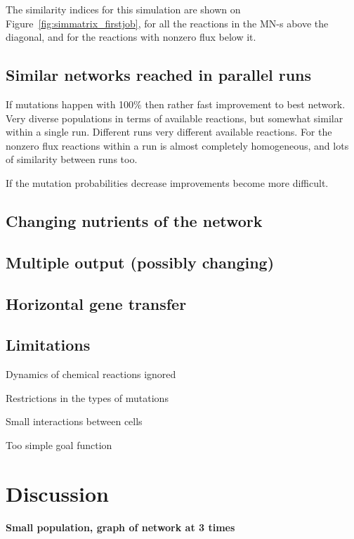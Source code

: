 \documentclass[10pt,a4paper]{article}
\begin{document}
The similarity indices for this simulation are shown on Figure~\ref{fig:simmatrix_firstjob}, for all the reactions in the MN-s above the diagonal, and for the reactions with nonzero flux below it. 


\subsection{Similar networks reached in parallel runs}
\label{sub:similar_networks_reached_in_paralell_runs}
If mutations happen with 100$\%$ then rather fast improvement to best network. Very diverse populations in terms of available reactions, but somewhat similar within a single run. Different runs very different available reactions. For the nonzero flux reactions within a run is almost completely homogeneous, and lots of similarity between runs too. 

If the mutation probabilities decrease improvements become more difficult.

\subsection{Changing nutrients of the network}
\label{sub:changing_nutrients_of_the_network}

\subsection{Multiple output (possibly changing)}
\label{sub:multiple_output_possibly_changing_}

\subsection{Horizontal gene transfer}
\label{sub:horizontal_gene_transfer}


\subsection{Limitations}
\label{sub:limitations}
Dynamics of chemical reactions ignored

Restrictions in the types of mutations

Small interactions between cells

Too simple goal function



\section{Discussion}
\label{sec:discussion}
\textbf{Small population, graph of network at 3 times}
\end{document}
